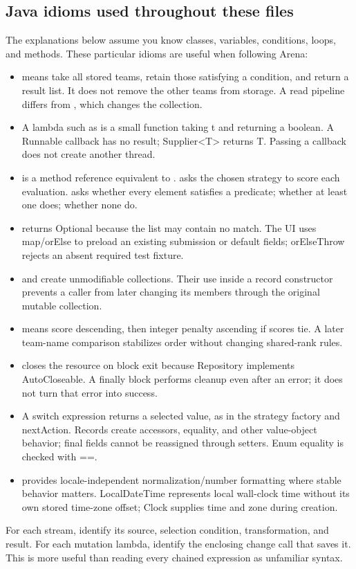 \documentclass[12pt]{article}
\begin{document}
\subsection{Java idioms used throughout these files}
The explanations below assume you know classes, variables, conditions, loops, and methods. These particular idioms are useful when following Arena:
\begin{itemize}
\item {} means take all stored teams, retain those satisfying a condition, and return a result list. It does not remove the other teams from storage. A read pipeline differs from , which changes the collection.
\item A lambda such as  is a small function taking t and returning a boolean. A Runnable callback has no result; Supplier<T> returns T. Passing a callback does not create another thread.
\item {} is a method reference equivalent to .  asks the chosen strategy to score each evaluation.  asks whether every element satisfies a predicate;  whether at least one does;  whether none do.
\item {} returns Optional because the list may contain no match. The UI uses map/orElse to preload an existing submission or default fields; orElseThrow rejects an absent required test fixture.
\item {} and  create unmodifiable collections. Their use inside a record constructor prevents a caller from later changing its members through the original mutable collection.
\item {} means score descending, then integer penalty ascending if scores tie. A later team-name comparison stabilizes order without changing shared-rank rules.
\item {} closes the resource on block exit because Repository implements AutoCloseable. A finally block performs cleanup even after an error; it does not turn that error into success.
\item A switch expression returns a selected value, as in the strategy factory and nextAction. Records create accessors, equality, and other value-object behavior; final fields cannot be reassigned through setters. Enum equality is checked with ==.
\item {} provides locale-independent normalization/number formatting where stable behavior matters. LocalDateTime represents local wall-clock time without its own stored time-zone offset; Clock supplies time and zone during creation.
\end{itemize}
For each stream, identify its source, selection condition, transformation, and result. For each mutation lambda, identify the enclosing change call that saves it. This is more useful than reading every chained expression as unfamiliar syntax.
\end{document}

